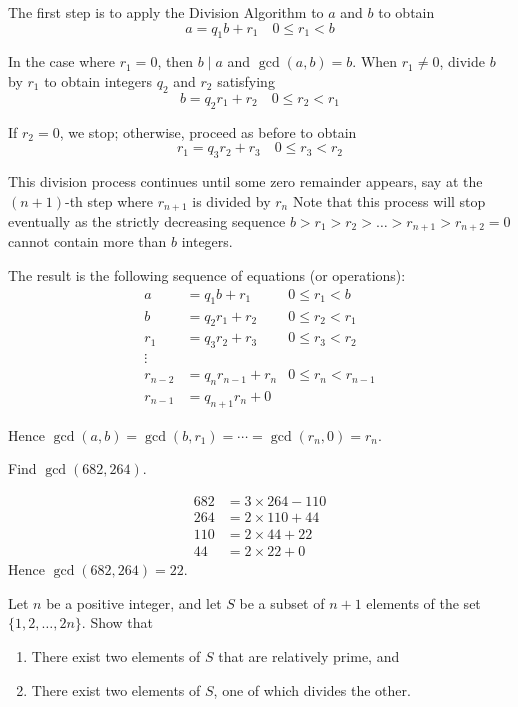 The first step is to apply the Division Algorithm to $a$ and $b$ to obtain
\[a = q_1b + r_1 \quad 0 \le r_1 < b\]

In the case where $r_1 = 0$, then $b \mid  a$ and $\gcd(a,b) = b$. When $r_1 \neq 0$, divide $b$ by $r_1$ to obtain integers $q_2$ and $r_2$ satisfying
\[b = q_2r_1 + r_2 \quad 0 \le r_2 < r_1\]

If $r_2 = 0$, we stop; otherwise, proceed as before to obtain
\[r_1 = q_3r_2 + r_3 \quad 0 \le r_3 < r_2\]

This division process continues until some zero remainder appears, say at the $(n+1)$-th step where $r_{n+1}$ is divided by $r_n$ Note that this process will stop eventually as the strictly decreasing sequence $b > r_1 > r_2 > \dots > r_{n+1} > r_{n+2} = 0$ cannot contain more than $b$ integers.

The result is the following sequence of equations (or operations):
\begin{align*}
a &= q_1b + r_1 & 0 \le r_1 < b \\
b &= q_2r_1 + r_2 & 0 \le r_2 < r_1 \\
r_1 &= q_3r_2 + r_3 & 0 \le r_3 < r_2 \\
\vdots \\
r_{n-2} &= q_nr_{n-1} + r_n & 0 \le r_n < r_{n-1} \\
r_{n-1} &= q_{n+1} r_n + 0
\end{align*}

Hence $\gcd(a,b)=\gcd(b,r_1)=\cdots=\gcd(r_n,0)=r_n$. 

\begin{exercise}
Find $\gcd(682,264)$.
\end{exercise}

\begin{solution}
\begin{align*}
682 &= 3\times264-110 \\
264 &= 2\times110+44 \\
110 &= 2\times44+22 \\
44 &= 2\times22+0
\end{align*}
Hence $\gcd(682,264)=\boxed{22}$.
\end{solution}

\begin{exercise}
Let $n$ be a positive integer, and let $S$ be a subset of $n+1$ elements of the set $\{1,2,\dots,2n\}$. Show that
\begin{enumerate}[label=(\alph*)]
\item There exist two elements of $S$ that are relatively prime, and
\item There exist two elements of $S$, one of which divides the other.
\end{enumerate}
\end{exercise}

